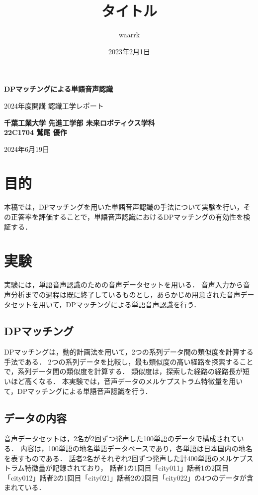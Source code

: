 \documentclass[dvipdfmx,titlepage,a4j]{jsarticle}
\title{タイトル}
\author{waarrk}
\date{2023年2月1日}
\begin{document}
\begin{titlepage}
    \centering
    \vspace*{2cm}

    \vspace{1cm}

    {\LARGE \textbf{DPマッチングによる単語音声認識}}

    \vspace{0.5cm}

    {\LARGE 2024年度開講 認識工学レポート}

    \vspace{1.5cm}

    {\textbf{千葉工業大学 先進工学部 未来ロボティクス学科}\\}
    {\textbf{22C1704 鷲尾 優作}}

    \vfill

    {\large 2024年6月19日}

    \vspace{1cm}
\end{titlepage}

\section{目的}
本稿では，DPマッチングを用いた単語音声認識の手法について実験を行い，その正答率を評価することで，単語音声認識におけるDPマッチングの有効性を検証する．

\section{実験}
実験には，単語音声認識のための音声データセットを用いる．
音声入力から音声分析までの過程は既に終了しているものとし，あらかじめ用意された音声データセットを用いて，DPマッチングによる単語音声認識を行う．

\subsection{DPマッチング}
DPマッチングは，動的計画法を用いて，2つの系列データ間の類似度を計算する手法である．
2つの系列データを比較し，最も類似度の高い経路を探索することで，系列データ間の類似度を計算する．
類似度は，探索した経路の経路長が短いほど高くなる．
本実験では，音声データのメルケプストラム特徴量を用いて，DPマッチングによる単語音声認識を行う．

\subsection{データの内容}
音声データセットは，2名が2回ずつ発声した100単語のデータで構成されている．
内容は，100単語の地名単語データベースであり，各単語は日本国内の地名を表すものである．
話者2名がそれぞれ2回ずつ発声した計400単語のメルケプストラム特徴量が記録されており，
話者1の1回目「city011」話者1の2回目「city012」話者2の1回目「city021」話者2の2回目「city022」の4つのデータが含まれている．
\end{document}
